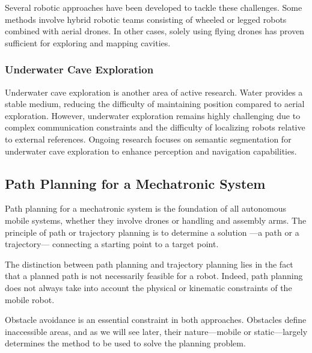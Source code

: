 \documentclass[../main.tex]{subfiles}
\begin{document}
Several robotic approaches have been developed to tackle these challenges. Some methods involve hybrid robotic teams consisting of wheeled or legged robots combined with aerial drones.\cite{dang_2020} In other cases, solely using flying drones has proven sufficient for exploring and mapping cavities.\cite{dharmadhikari_2021, zhang_2017, husian_2013, petracek_2021}

\subsubsection{Underwater Cave Exploration}

Underwater cave exploration is another area of active research. Water provides a stable medium, reducing the difficulty of maintaining position compared to aerial exploration. However, underwater exploration remains highly challenging due to complex communication constraints and the difficulty of localizing robots relative to external references. Ongoing research focuses on semantic segmentation for underwater cave exploration to enhance perception and navigation capabilities.\cite{gupta_2025, abdullah_2024}



\subsection{Path Planning for a Mechatronic System}

Path planning for a mechatronic system is the foundation of all autonomous mobile systems, whether they involve drones or handling and assembly arms. The principle of path or trajectory planning is to determine a solution —a path or a trajectory— connecting a starting point to a target point.

\vspace{1em}

The distinction between path planning and trajectory planning lies in the fact that a planned path is not necessarily feasible for a robot. Indeed, path planning does not always take into account the physical or kinematic constraints of the mobile robot.

\vspace{1em}

Obstacle avoidance is an essential constraint in both approaches. Obstacles define inaccessible areas, and as we will see later, their nature—mobile or static—largely determines the method to be used to solve the planning problem.\\
\end{document}
